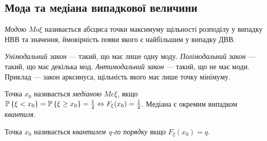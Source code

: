 \subsection{Мода та медіана випадкової величини}
\begin{definition}
    \emph{Модою} ${Mo}\xi$ називається абсциса точки максимуму щільності 
    розподілу у випадку НВВ та значення, ймовірність 
    появи якого є найбільшим у випадку ДВВ.

    \emph{Унімодальний закон} --- такий, що має лише одну моду. 
    \emph{Полімодальний закон} --- такий, що має декілька мод.
    \emph{Антимодальний закон} --- такий, що не має моди. Приклад --- закон арксинуса, щільність якого має лише точку мінімуму.
\end{definition}
\begin{definition}
    Точка $x_0$ називається \emph{медіаною} $Me\xi$, якщо 
    $\P\left\{\xi < x_0\right\} = \P\left\{\xi \geq x_0\right\} 
    = \frac{1}{2} \Leftrightarrow F_\xi(x_0) = \frac{1}{2}$.
    Медіана є окремим випадком \emph{квантиля}.
\end{definition}
\begin{definition}
    Точка $x_0$ називається \emph{квантилем q-го порядку} якщо $F_\xi(x_0) = q$.
\end{definition}
